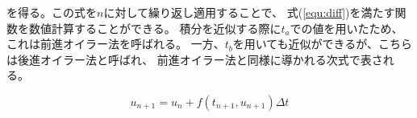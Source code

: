 \documentclass[a4j, titlepage]{jsarticle}
\begin{document}
        を得る。この式を$n$に対して繰り返し適用することで、
        式(\ref{equ:diff})を満たす関数を数値計算することができる。
        積分を近似する際に$t_a$での値を用いたため、これは前進オイラー法を呼ばれる。
        一方、$t_b$を用いても近似ができるが、こちらは後進オイラー法と呼ばれ、
        前進オイラー法と同様に導かれる次式で表される。

        \begin{equation*}
            u_{n + 1} =  u_n + f(t_{n + 1}, u_{n + 1})\Delta t
        \end{equation*}

\begin{thebibliography}{99}
\end{thebibliography}
\end{document}
